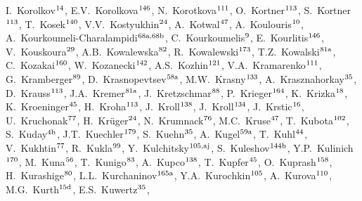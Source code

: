\begin{flushleft}
I.~Korolkov$^\textrm{\scriptsize 14}$,    
E.V.~Korolkova$^\textrm{\scriptsize 146}$,    
N.~Korotkova$^\textrm{\scriptsize 111}$,    
O.~Kortner$^\textrm{\scriptsize 113}$,    
S.~Kortner$^\textrm{\scriptsize 113}$,    
T.~Kosek$^\textrm{\scriptsize 140}$,    
V.V.~Kostyukhin$^\textrm{\scriptsize 24}$,    
A.~Kotwal$^\textrm{\scriptsize 47}$,    
A.~Koulouris$^\textrm{\scriptsize 10}$,    
A.~Kourkoumeli-Charalampidi$^\textrm{\scriptsize 68a,68b}$,    
C.~Kourkoumelis$^\textrm{\scriptsize 9}$,    
E.~Kourlitis$^\textrm{\scriptsize 146}$,    
V.~Kouskoura$^\textrm{\scriptsize 29}$,    
A.B.~Kowalewska$^\textrm{\scriptsize 82}$,    
R.~Kowalewski$^\textrm{\scriptsize 173}$,    
T.Z.~Kowalski$^\textrm{\scriptsize 81a}$,    
C.~Kozakai$^\textrm{\scriptsize 160}$,    
W.~Kozanecki$^\textrm{\scriptsize 142}$,    
A.S.~Kozhin$^\textrm{\scriptsize 121}$,    
V.A.~Kramarenko$^\textrm{\scriptsize 111}$,    
G.~Kramberger$^\textrm{\scriptsize 89}$,    
D.~Krasnopevtsev$^\textrm{\scriptsize 58a}$,    
M.W.~Krasny$^\textrm{\scriptsize 133}$,    
A.~Krasznahorkay$^\textrm{\scriptsize 35}$,    
D.~Krauss$^\textrm{\scriptsize 113}$,    
J.A.~Kremer$^\textrm{\scriptsize 81a}$,    
J.~Kretzschmar$^\textrm{\scriptsize 88}$,    
P.~Krieger$^\textrm{\scriptsize 164}$,    
K.~Krizka$^\textrm{\scriptsize 18}$,    
K.~Kroeninger$^\textrm{\scriptsize 45}$,    
H.~Kroha$^\textrm{\scriptsize 113}$,    
J.~Kroll$^\textrm{\scriptsize 138}$,    
J.~Kroll$^\textrm{\scriptsize 134}$,    
J.~Krstic$^\textrm{\scriptsize 16}$,    
U.~Kruchonak$^\textrm{\scriptsize 77}$,    
H.~Kr\"uger$^\textrm{\scriptsize 24}$,    
N.~Krumnack$^\textrm{\scriptsize 76}$,    
M.C.~Kruse$^\textrm{\scriptsize 47}$,    
T.~Kubota$^\textrm{\scriptsize 102}$,    
S.~Kuday$^\textrm{\scriptsize 4b}$,    
J.T.~Kuechler$^\textrm{\scriptsize 179}$,    
S.~Kuehn$^\textrm{\scriptsize 35}$,    
A.~Kugel$^\textrm{\scriptsize 59a}$,    
T.~Kuhl$^\textrm{\scriptsize 44}$,    
V.~Kukhtin$^\textrm{\scriptsize 77}$,    
R.~Kukla$^\textrm{\scriptsize 99}$,    
Y.~Kulchitsky$^\textrm{\scriptsize 105,aj}$,    
S.~Kuleshov$^\textrm{\scriptsize 144b}$,    
Y.P.~Kulinich$^\textrm{\scriptsize 170}$,    
M.~Kuna$^\textrm{\scriptsize 56}$,    
T.~Kunigo$^\textrm{\scriptsize 83}$,    
A.~Kupco$^\textrm{\scriptsize 138}$,    
T.~Kupfer$^\textrm{\scriptsize 45}$,    
O.~Kuprash$^\textrm{\scriptsize 158}$,    
H.~Kurashige$^\textrm{\scriptsize 80}$,    
L.L.~Kurchaninov$^\textrm{\scriptsize 165a}$,    
Y.A.~Kurochkin$^\textrm{\scriptsize 105}$,    
A.~Kurova$^\textrm{\scriptsize 110}$,    
M.G.~Kurth$^\textrm{\scriptsize 15d}$,    
E.S.~Kuwertz$^\textrm{\scriptsize 35}$,    

\end{flushleft}
